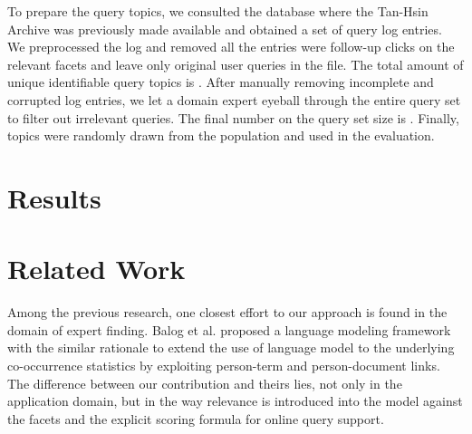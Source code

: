 To prepare the query topics, we consulted the database where the Tan-Hsin
Archive was previously made available and obtained a set of query log entries.
We preprocessed the log and removed all the entries were follow-up clicks on
the relevant facets and leave only original user queries in the file.  The
total amount of unique identifiable query topics is .  After
manually removing incomplete and corrupted log entries, we let a domain expert
eyeball through the entire query set to filter out irrelevant queries.   The
final number on the query set size is .  Finally, 
topics were randomly drawn from the population and used in the evaluation.

\section{Results}


\section{Related Work}



Among the previous research, one closest effort to our approach is found in the
domain of expert finding.  Balog et al. \cite{balog2009language} proposed a
language modeling framework with the similar rationale to extend the use of
language model to the underlying co-occurrence statistics by exploiting
person-term and person-document links.  The difference between our contribution
and theirs lies, not only in the application domain, but in the way relevance
is introduced into the model against the facets and the explicit scoring
formula for online query support.
 
